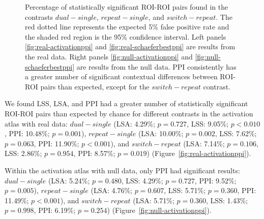 \documentclass[phd,appendix,figures]{uithesis}
\begin{document}
\begin{figure}[H]
  \centering
  \hfill
  \vfill
  \hfill
  \caption{
    Percentage of statistically significant ROI-ROI pairs found
    in the contrasts $dual - single$, $repeat - single$, and
    $switch - repeat$.
    The red dotted line represents the expected 5\% false positive rate
    and the shaded red region is the 95\% confidence interval.
    Left panels \ref{fig:real-activationppi} and \ref{fig:real-schaeferbestppi}
    are results from the real data.
    Right panels \ref{fig:null-activationppi} and \ref{fig:null-schaeferbestppi} are results
    from the null data.
    PPI consistently has a greater number of significant contextual differences between ROI-ROI pairs
    than expected, except for the $switch - repeat$ contrast.
  }
\label{fig:main-resultppi}
\end{figure}

We found LSS, LSA, and PPI had a greater number of statistically significant ROI-ROI pairs than expected by chance
for different contrasts in the activation atlas with real data: $dual - single$ (LSA: 4.29\%; $p = 0.727$,
LSS: 9.05\%; $p < 0.010$, PPI: 10.48\%; $p = 0.001$),
$repeat - single$ (LSA: 10.00\%; $p = 0.002$, LSS: 7.62\%; $p = 0.063$, PPI: 11.90\%; $p < 0.001$), and
$switch - repeat$ (LSA: 7.14\%; $p = 0.106$, LSS: 2.86\%; $p = 0.954$, PPI: 8.57\%; $p = 0.019$) (Figure~\ref{fig:real-activationppi}).

Within the activation atlas with null data, only PPI had significant results:
$dual - single$ (LSA: 5.24\%; $p = 0.480$, LSS: 4.29\%; $p = 0.727$, PPI: 9.52\%; $p = 0.005$),
$repeat - single$ (LSA: 4.76\%; $p = 0.607$, LSS: 5.71\%; $p = 0.360$, PPI: 11.49\%; $p < 0.001$), and
$switch - repeat$ (LSA: 5.71\%; $p = 0.360$, LSS: 1.43\%; $p = 0.998$, PPI: 6.19\%; $p = 0.254$) (Figure~\ref{fig:null-activationppi}).
\end{document}
